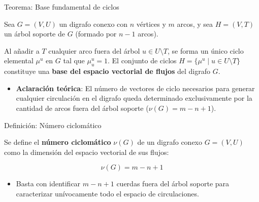 \documentclass[
  ignorenonframetext,
]{beamer}
\providecommand{\tightlist}{%
  \setlength{\itemsep}{0pt}\setlength{\parskip}{0pt}}
\begin{document}
\begin{frame}{Teorema: Base fundamental de ciclos}
\label{teorema-base-fundamental-de-ciclos}
\begin{tcolorbox}[enhanced jigsaw, opacityback=0, breakable, title=\textcolor{quarto-callout-important-color}{\faExclamation}\hspace{0.5em}{Base fundamental de ciclos}, colback=white, colbacktitle=quarto-callout-important-color!10!white, bottomrule=.15mm, opacitybacktitle=0.6, coltitle=black, bottomtitle=1mm, leftrule=.75mm, colframe=quarto-callout-important-color-frame, toptitle=1mm, titlerule=0mm, rightrule=.15mm, left=2mm, arc=.35mm, toprule=.15mm]

Sea \(G = (V, U)\) un digrafo conexo con \(n\) vértices y \(m\) arcos, y
sea \(H = (V, T)\) un árbol soporte de \(G\) (formado por \(n - 1\)
arcos).

Al añadir a \(T\) cualquier arco fuera del árbol
\(u \in U \setminus T\), se forma un único ciclo elemental \(\mu^u\) en
\(G\) tal que \(\mu^u_u = 1\). El conjunto de ciclos
\(H = \{\mu^u \mid u \in U \setminus T\}\) constituye una \textbf{base
del espacio vectorial de flujos} del digrafo \(G\).

\end{tcolorbox}

\begin{itemize}
\tightlist
\item
  \textbf{Aclaración teórica}: El número de vectores de ciclo necesarios
  para generar cualquier circulación en el digrafo queda determinado
  exclusivamente por la cantidad de arcos fuera del árbol soporte
  (\(\nu(G) = m - n + 1\)).
\end{itemize}
\end{frame}

\begin{frame}{Definición: Número ciclomático}
\label{definiciuxf3n-nuxfamero-ciclomuxe1tico}
\begin{tcolorbox}[enhanced jigsaw, opacityback=0, breakable, title=\textcolor{quarto-callout-note-color}{\faInfo}\hspace{0.5em}{Número ciclomático}, colback=white, colbacktitle=quarto-callout-note-color!10!white, bottomrule=.15mm, opacitybacktitle=0.6, coltitle=black, bottomtitle=1mm, leftrule=.75mm, colframe=quarto-callout-note-color-frame, toptitle=1mm, titlerule=0mm, rightrule=.15mm, left=2mm, arc=.35mm, toprule=.15mm]

Se define el \textbf{número ciclomático} \(\nu(G)\) de un digrafo conexo
\(G = (V, U)\) como la dimensión del espacio vectorial de sus flujos:

\[
\nu(G) = m - n + 1
\]

\end{tcolorbox}

\begin{itemize}
\tightlist
\item
  Basta con identificar \(m - n + 1\) cuerdas fuera del árbol soporte
  para caracterizar unívocamente todo el espacio de circulaciones.
\end{itemize}
\end{frame}
\end{document}
